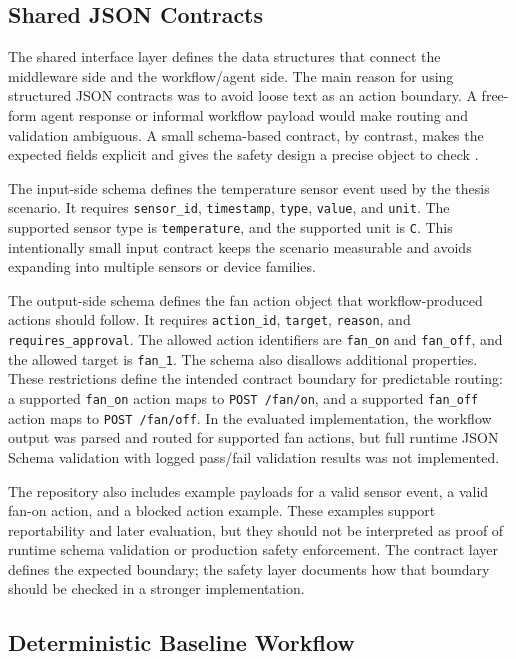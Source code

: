 \subsection{Shared JSON Contracts}\label{subsec:implementation-contracts}

The shared interface layer defines the data structures that connect the middleware side and the workflow/agent side. The main reason for using structured JSON contracts was to avoid loose text as an action boundary. A free-form agent response or informal workflow payload would make routing and validation ambiguous. A small schema-based contract, by contrast, makes the expected fields explicit and gives the safety design a precise object to check \cite{jsonSchemaDocs}.

The input-side schema defines the temperature sensor event used by the thesis scenario. It requires \texttt{sensor\_id}, \texttt{timestamp}, \texttt{type}, \texttt{value}, and \texttt{unit}. The supported sensor type is \texttt{temperature}, and the supported unit is \texttt{C}. This intentionally small input contract keeps the scenario measurable and avoids expanding into multiple sensors or device families.

The output-side schema defines the fan action object that workflow-produced actions should follow. It requires \texttt{action\_id}, \texttt{target}, \texttt{reason}, and \texttt{requires\_approval}. The allowed action identifiers are \texttt{fan\_on} and \texttt{fan\_off}, and the allowed target is \texttt{fan\_1}. The schema also disallows additional properties. These restrictions define the intended contract boundary for predictable routing: a supported \texttt{fan\_on} action maps to \texttt{POST /fan/on}, and a supported \texttt{fan\_off} action maps to \texttt{POST /fan/off}. In the evaluated implementation, the workflow output was parsed and routed for supported fan actions, but full runtime JSON Schema validation with logged pass/fail validation results was not implemented.

The repository also includes example payloads for a valid sensor event, a valid fan-on action, and a blocked action example. These examples support reportability and later evaluation, but they should not be interpreted as proof of runtime schema validation or production safety enforcement. The contract layer defines the expected boundary; the safety layer documents how that boundary should be checked in a stronger implementation.

\subsection{Deterministic Baseline Workflow}\label{subsec:implementation-deterministic}

